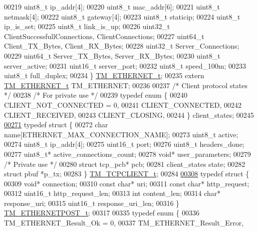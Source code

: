 \begin{DoxyCode}
00219     uint8\_t ip\_addr[4];
00220     uint8\_t mac\_addr[6];
00221     uint8\_t netmask[4];
00222     uint8\_t gateway[4];
00223     uint8\_t staticip;
00224     uint8\_t ip\_is\_set;
00225     uint8\_t link\_is\_up;
00226     uint32\_t ClientSuccessfullConnections, ClientConnections;
00227     uint64\_t Client\_TX\_Bytes, Client\_RX\_Bytes;
00228     uint32\_t Server\_Connections;
00229     uint64\_t Server\_TX\_Bytes, Server\_RX\_Bytes;
00230     uint8\_t server\_active;
00231     uint16\_t server\_port;
00232     uint8\_t speed\_100m;
00233     uint8\_t full\_duplex;
00234 \} \hyperlink{struct_t_m___e_t_h_e_r_n_e_t__t}{TM\_ETHERNET\_t};
00235 \textcolor{keyword}{extern} \hyperlink{struct_t_m___e_t_h_e_r_n_e_t__t}{TM\_ETHERNET\_t} TM\_ETHERNET;
00236 
00237 \textcolor{comment}{/* Client protocol states */}
00238 \textcolor{comment}{/* For private use */}
00239 \textcolor{keyword}{typedef} \textcolor{keyword}{enum}  \{
00240     CLIENT\_NOT\_CONNECTED = 0,
00241     CLIENT\_CONNECTED,
00242     CLIENT\_RECEIVED,
00243     CLIENT\_CLOSING,
00244 \} client\_states;
00245 
\hypertarget{tm__stm32f4__ethernet_8h_source_l00271}{}\hyperlink{struct_t_m___t_c_p_c_l_i_e_n_t__t}{00271} \textcolor{keyword}{typedef} \textcolor{keyword}{struct }\{
00272     \textcolor{keywordtype}{char} name[ETHERNET\_MAX\_CONNECTION\_NAME];
00273     uint8\_t active;
00274     uint8\_t ip\_addr[4];
00275     uint16\_t port;
00276     uint8\_t headers\_done;
00277     uint8\_t* active\_connections\_count;
00278     \textcolor{keywordtype}{void}* user\_parameters;
00279     \textcolor{comment}{/* Private use */}
00280     \textcolor{keyword}{struct }tcp\_pcb* pcb;
00281     client\_states state;
00282     \textcolor{keyword}{struct }pbuf *p\_tx;
00283 \} \hyperlink{struct_t_m___t_c_p_c_l_i_e_n_t__t}{TM\_TCPCLIENT\_t};
00284 
\hypertarget{tm__stm32f4__ethernet_8h_source_l00308}{}\hyperlink{struct_t_m___e_t_h_e_r_n_e_t_p_o_s_t__t}{00308} \textcolor{keyword}{typedef} \textcolor{keyword}{struct }\{
00309     \textcolor{keywordtype}{void}* connection;
00310     \textcolor{keyword}{const} \textcolor{keywordtype}{char}* uri;
00311     \textcolor{keyword}{const} \textcolor{keywordtype}{char}* http\_request;
00312     uint16\_t http\_request\_len;
00313     \textcolor{keywordtype}{int} content\_len;
00314     \textcolor{keywordtype}{char}* response\_uri;
00315     uint16\_t response\_uri\_len;
00316 \} \hyperlink{struct_t_m___e_t_h_e_r_n_e_t_p_o_s_t__t}{TM\_ETHERNETPOST\_t};
00317 
00335 \textcolor{keyword}{typedef} \textcolor{keyword}{enum} \{
00336     TM\_ETHERNET\_Result\_Ok = 0,
00337     TM\_ETHERNET\_Result\_Error,

\end{DoxyCode}
